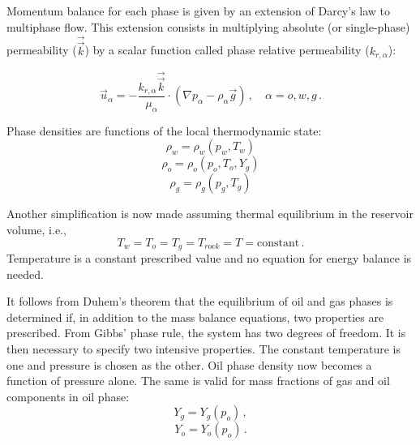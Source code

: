 \documentclass[authoryear,preprint,review,11pt]{elsarticle}
\begin{document}
Momentum balance for each phase is given by an extension of Darcy's law to multiphase flow. This extension consists in multiplying absolute (or single-phase) permeability ($\vec{\vec{k}}$) by a scalar function called phase relative permeability ($k_{r,\alpha}$):

\begin{equation}\label{eq: exdarcy}
\vec{u}_\alpha = -\frac{k_{r,\alpha} \vec{\vec{k}}}{\mu_\alpha}\cdot \left(\nabla p_\alpha - \rho_\alpha \vec{g}\right) \, , \quad \alpha=o,w,g \, .
\end{equation}

Phase densities are functions of the local thermodynamic state:
\begin{equation}
\rho_w = \rho_w \left(p_w, T_w\right)
\end{equation}
\begin{equation}
\rho_o = \rho_o \left(p_o, T_o,Y_g\right)
\end{equation}
\begin{equation}
\rho_g = \rho_g \left(p_g, T_g\right)
\end{equation}

Another simplification is now made assuming thermal equilibrium in the reservoir volume, i.e.,
\begin{equation}
T_w = T_o = T_g = T_{rock} = T = \text{constant} \, .
\end{equation}
Temperature is a constant prescribed value and no equation for energy balance is needed. 


It follows from Duhem's theorem that the equilibrium of oil and gas phases is determined if, in addition to the mass balance equations, two properties are prescribed. From Gibbs' phase rule, the system has two degrees of freedom. It is then necessary to specify two intensive properties. The constant temperature is one and pressure is chosen as the other. Oil phase density now becomes a function of pressure alone. The same is valid for mass fractions of gas and oil components in oil phase:
\begin{equation}
Y_g = Y_g (p_o) \, ,
\end{equation}
\begin{equation}
Y_o = Y_o (p_o) \, .
\end{equation}
\end{document}
